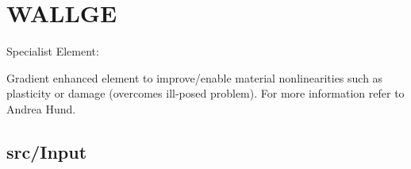 


\chapter{WALLGE}
Specialist Element:

Gradient enhanced element to improve/enable material nonlinearities
such as plasticity or damage (overcomes ill-posed problem). For more
information refer to Andrea Hund.

\section{src/Input} 

